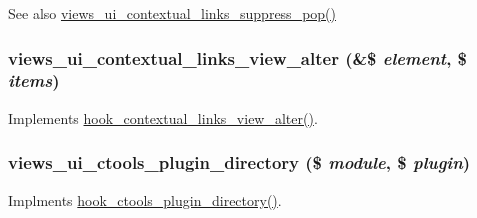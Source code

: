 \begin{DoxySeeAlso}{See also}
\hyperlink{views__ui_8module_ab6dfabb5c82c088831c6ef269c39b4db}{views\_\-ui\_\-contextual\_\-links\_\-suppress\_\-pop()} 
\end{DoxySeeAlso}
\hypertarget{views__ui_8module_a5b9dd769ef8a18413dcf7b3342779947}{
\subsubsection[{views\_\-ui\_\-contextual\_\-links\_\-view\_\-alter}]{\setlength{\rightskip}{0pt plus 5cm}views\_\-ui\_\-contextual\_\-links\_\-view\_\-alter (\&\$ {\em element}, \/  \$ {\em items})}}
\label{views__ui_8module_a5b9dd769ef8a18413dcf7b3342779947}
Implements \hyperlink{group__hooks_ga30ebdd98be1d239b608b769bda0ca9f0}{hook\_\-contextual\_\-links\_\-view\_\-alter()}. \hypertarget{views__ui_8module_abc525dd2fcbb81c7499c9df4828e902b}{
\subsubsection[{views\_\-ui\_\-ctools\_\-plugin\_\-directory}]{\setlength{\rightskip}{0pt plus 5cm}views\_\-ui\_\-ctools\_\-plugin\_\-directory (\$ {\em module}, \/  \$ {\em plugin})}}
\label{views__ui_8module_abc525dd2fcbb81c7499c9df4828e902b}
Implments \hyperlink{group__hooks_gaf17a0de7a7ca6e6c30c766ea1e44715e}{hook\_\-ctools\_\-plugin\_\-directory()}.

